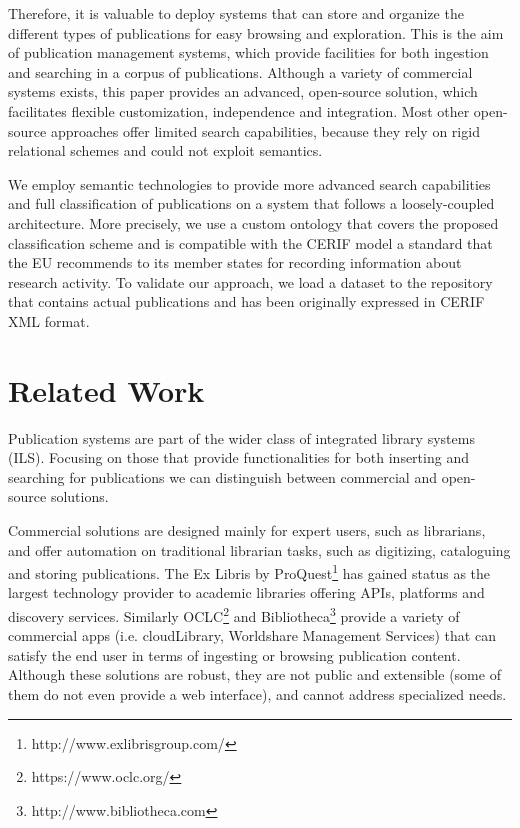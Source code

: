 \documentclass[runningheads,a4paper]{llncs}
\begin{document}
Therefore, it is valuable to deploy systems that can store and organize the different types of publications for easy browsing and exploration. This is the aim of publication management systems, which provide facilities for both ingestion and searching in a corpus of publications. Although a variety of commercial systems exists, this paper provides an advanced, open-source solution, which facilitates flexible customization, independence and integration. Most other open-source approaches offer limited search capabilities, because they rely on rigid relational schemes and could not exploit semantics.

We employ semantic technologies to provide more advanced search capabilities and full classification of publications on a system that follows a loosely-coupled architecture. More precisely, we use a custom ontology that covers the proposed classification scheme and is compatible with the CERIF model  \cite{_Ref474417470} a standard that the EU recommends to its member states for recording information about research activity. To validate our approach, we load a dataset to the repository that contains actual publications and has been originally expressed in CERIF XML format.



\section{Related Work}

Publication systems are part of the wider class of integrated library systems (ILS). Focusing on those that provide functionalities for both inserting and searching for publications we can distinguish between commercial and open-source solutions. 

Commercial solutions are designed mainly for expert users, such as librarians, and offer automation on traditional librarian tasks, such as digitizing, cataloguing and storing publications. The Ex Libris by ProQuest\footnote{ http://www.exlibrisgroup.com/} has gained status as the largest technology provider to academic libraries  \cite{_Ref490663034} offering APIs, platforms and discovery services. Similarly OCLC\footnote{ https://www.oclc.org/} and Bibliotheca\footnote{ http://www.bibliotheca.com} provide a variety of commercial apps (i.e. cloudLibrary, Worldshare Management Services) that can satisfy the end user in terms of ingesting or browsing publication content. Although these solutions are robust, they are not public and extensible (some of them do not even provide a web interface), and cannot address specialized needs. 
\end{document}
